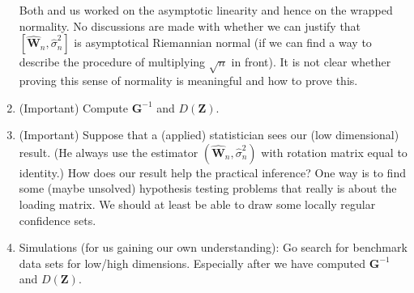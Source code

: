 \documentclass[12pt]{report}
\renewcommand{\bibname}{Références}
\newcommand{\squared}[1]{\left [ #1 \right ]}
\theoremstyle{plain}
\theoremstyle{definition}
\begin{document}
\begin{CJK*}{UTF8}{gbsn}
\begin{enumerate}
  Both 
  \cite{Sun_Lin_Liu_2026} and us worked on the asymptotic linearity 
  and hence on the wrapped normality.
  No discussions are made with 
  whether we can justify that $\squared{\hat{\bm{W}}_n, \hat{\sigma}_n^2}$
  is asymptotical Riemannian normal (if we can find a 
  way to describe the procedure of multiplying $\sqrt{n}$ in front).
  It is not clear whether proving this sense of normality is meaningful
  and how to prove this.
  \item (Important) Compute $\bm{G}^{-1}$ and $D(\bm{Z})$.
  \item (Important) Suppose that a (applied) statistician sees our (low dimensional)
  result. (He always use the estimator $(\hat{\bm{W}}_n, \hat{\sigma}_n^2)$
  with rotation matrix equal to identity.) How does our result help the practical inference?
  One way is to find some (maybe unsolved) hypothesis testing problems that really is about 
  the loading matrix.
  We should at least be able to draw some locally regular confidence sets.
  \item Simulations (for us gaining our own understanding):
  Go search for benchmark data sets for low/high dimensions.
  Especially after we have computed $\bm{G}^{-1}$ and $D(\bm{Z})$.
\end{enumerate}


\def\bibname{References} %

\end{CJK*}
\end{document}
